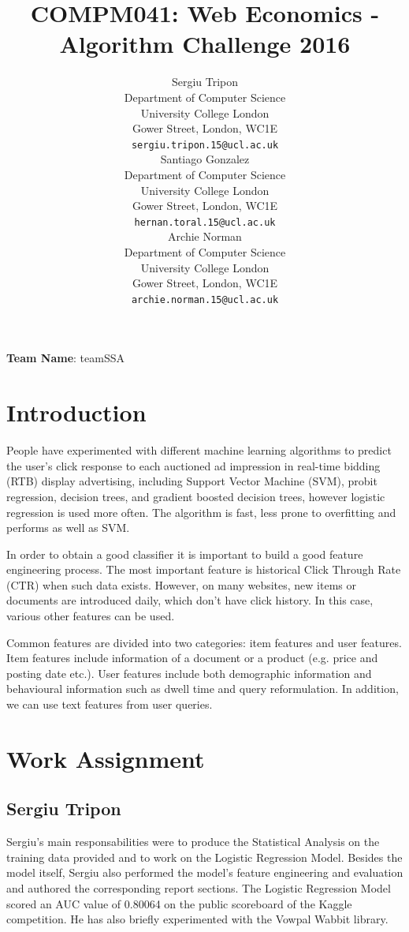 \documentclass{article} %
\title{COMPM041: Web Economics - Algorithm Challenge 2016}
\author{
Sergiu Tripon\\
Department of Computer Science\\
University College London\\
Gower Street, London, WC1E\\
\texttt{sergiu.tripon.15@ucl.ac.uk}\\
\And
Santiago Gonzalez\\
Department of Computer Science\\
University College London\\
Gower Street, London, WC1E\\
\texttt{hernan.toral.15@ucl.ac.uk} \\
\And
Archie Norman \\
Department of Computer Science\\
University College London\\
Gower Street, London, WC1E\\
\texttt{archie.norman.15@ucl.ac.uk} \\
}
\begin{document}
\maketitle

\textbf{Team Name}: teamSSA\\

\section{Introduction}

People have experimented with different machine learning algorithms to predict the user’s click response to each auctioned ad impression in real-time bidding (RTB) display advertising, including Support Vector Machine (SVM), probit regression, decision trees, and gradient boosted decision trees, however logistic regression is used more often. The algorithm is fast, less prone to overfitting and performs as well as SVM.

In order to obtain a good classifier it is important to build a good feature engineering process. The most important feature is historical Click Through Rate (CTR) when such data exists. However, on many websites, new items or documents are introduced daily, which don't have click history. In this case, various other features can be used.

Common features are divided into two categories: item features and user features. Item features include information of a document or a product (e.g. price and posting date etc.). User features include both demographic information and behavioural information such as dwell time and query reformulation. In addition, we can use text features from user queries.

\section{Work Assignment}

\subsection{Sergiu Tripon}

Sergiu's main responsabilities were to produce the Statistical Analysis on the training data provided and to work on the Logistic Regression Model. Besides the model itself, Sergiu also performed the model's feature engineering and evaluation and authored the corresponding report sections. The Logistic Regression Model scored an AUC value of 0.80064 on the public scoreboard of the Kaggle competition. He has also briefly experimented with the Vowpal Wabbit library.
\end{document}
